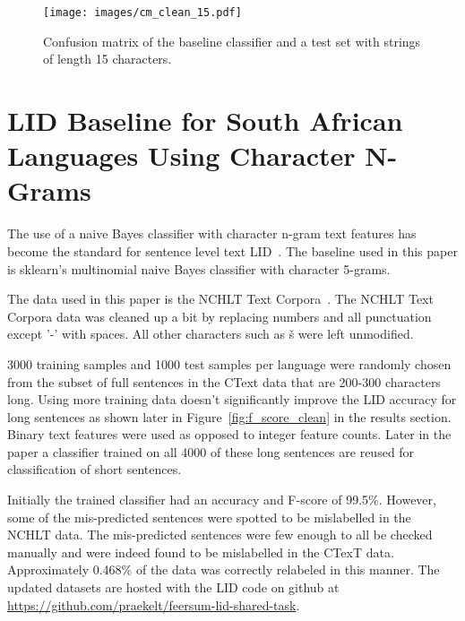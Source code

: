 \documentclass[conference]{IEEEtran}
\begin{document}

\begin{figure*}[!t]
\centering
\texttt{[image: images/cm\_clean\_15.pdf]}
\caption{Confusion matrix of the baseline classifier and a test set with strings of length 15 characters.}
\label{fig:cm_clean_15}
\end{figure*}

\section{LID Baseline for South African Languages Using Character N-Grams}
\label{sec:baseline}
The use of a naive Bayes classifier with character n-gram text features has become the standard for sentence level text LID~\cite{BothaBarnard2012}. The baseline used in this paper is sklearn's multinomial naive Bayes classifier with character 5-grams. 

The data used in this paper is the NCHLT Text Corpora~\cite{NCHLTTextCorpora}\cite{EiselenPuttkammer2014}. The NCHLT Text Corpora data was cleaned up a bit by replacing numbers and all punctuation except '-' with spaces. All other characters such as \v{s} were left unmodified.

3000 training samples and 1000 test samples per language were randomly chosen from the subset of full sentences in the CText data that are 200-300 characters long. Using more training data doesn't significantly improve the LID accuracy for long sentences as shown later in Figure~\ref{fig:f_score_clean} in the results section. Binary text features were used as opposed to integer feature counts. Later in the paper a classifier trained on all 4000 of these long sentences are reused for classification of short sentences.

Initially the trained classifier had an accuracy and F-score of 99.5\%. However, some of the mis-predicted sentences were spotted to be mislabelled in the NCHLT data. The mis-predicted sentences were few enough to all be checked manually and were indeed found to be mislabelled in the CTexT data. Approximately 0.468\% of the data was correctly relabeled in this manner. The updated datasets are hosted with the LID code on github at \url{https://github.com/praekelt/feersum-lid-shared-task}.
\end{document}
